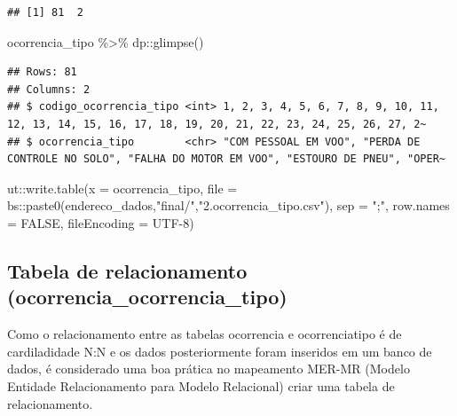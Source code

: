 \documentclass[
]{article}
\newenvironment{Shaded}{\begin{snugshade}}{\end{snugshade}}
\newcommand{\AttributeTok}[1]{\textcolor[rgb]{0.77,0.63,0.00}{#1}}
\newcommand{\ConstantTok}[1]{\textcolor[rgb]{0.00,0.00,0.00}{#1}}
\newcommand{\FunctionTok}[1]{\textcolor[rgb]{0.00,0.00,0.00}{#1}}
\newcommand{\NormalTok}[1]{#1}
\newcommand{\SpecialCharTok}[1]{\textcolor[rgb]{0.00,0.00,0.00}{#1}}
\newcommand{\StringTok}[1]{\textcolor[rgb]{0.31,0.60,0.02}{#1}}
\begin{document}
\begin{verbatim}
## [1] 81  2
\end{verbatim}

\begin{Shaded}
\begin{Highlighting}[]
\NormalTok{ocorrencia\_tipo }\SpecialCharTok{\%\textgreater{}\%}\NormalTok{ dp}\SpecialCharTok{::}\FunctionTok{glimpse}\NormalTok{()}
\end{Highlighting}
\end{Shaded}

\begin{verbatim}
## Rows: 81
## Columns: 2
## $ codigo_ocorrencia_tipo <int> 1, 2, 3, 4, 5, 6, 7, 8, 9, 10, 11, 12, 13, 14, 15, 16, 17, 18, 19, 20, 21, 22, 23, 24, 25, 26, 27, 2~
## $ ocorrencia_tipo        <chr> "COM PESSOAL EM VOO", "PERDA DE CONTROLE NO SOLO", "FALHA DO MOTOR EM VOO", "ESTOURO DE PNEU", "OPER~
\end{verbatim}

\begin{Shaded}
\begin{Highlighting}[]
\NormalTok{ut}\SpecialCharTok{::}\FunctionTok{write.table}\NormalTok{(}\AttributeTok{x =}\NormalTok{ ocorrencia\_tipo,}
            \AttributeTok{file =}\NormalTok{ bs}\SpecialCharTok{::}\FunctionTok{paste0}\NormalTok{(endereco\_dados,}\StringTok{"final/"}\NormalTok{,}\StringTok{"2.ocorrencia\_tipo.csv"}\NormalTok{),}
            \AttributeTok{sep =} \StringTok{";"}\NormalTok{,}
            \AttributeTok{row.names =} \ConstantTok{FALSE}\NormalTok{,}
            \AttributeTok{fileEncoding =} \StringTok{\textquotesingle{}UTF{-}8\textquotesingle{}}\NormalTok{)}
\end{Highlighting}
\end{Shaded}

\hypertarget{tabela-de-relacionamento-ocorrencia_ocorrencia_tipo}{%
\subsection{Tabela de relacionamento
(ocorrencia\_ocorrencia\_tipo)}\label{tabela-de-relacionamento-ocorrencia_ocorrencia_tipo}}

Como o relacionamento entre as tabelas ocorrencia e ocorrenciatipo é de
cardiladidade N:N e os dados posteriormente foram inseridos em um banco
de dados, é considerado uma boa prática no mapeamento MER-MR (Modelo
Entidade Relacionamento para Modelo Relacional) criar uma tabela de
relacionamento.
\end{document}
